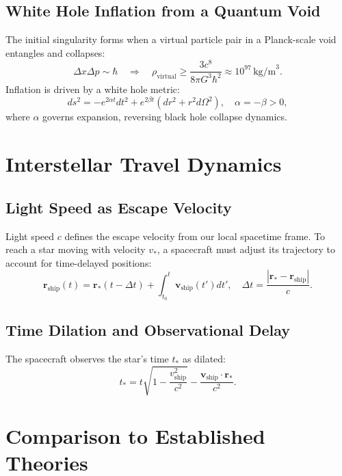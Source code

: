 \documentclass[12pt, a4paper]{article}
\begin{document}
\subsection{White Hole Inflation from a Quantum Void}
The initial singularity forms when a virtual particle pair in a Planck-scale void entangles and collapses:
\begin{equation}
\Delta x \Delta p \sim \hbar \quad \Rightarrow \quad \rho_{\text{virtual}} \geq \frac{3c^8}{8\pi G^3 \hbar^2} \approx 10^{97} \, \text{kg/m}^3. \label{eq:singularity}
\end{equation}
Inflation is driven by a white hole metric:
\begin{equation}
ds^2 = -e^{2\alpha t} dt^2 + e^{2\beta t} \left( dr^2 + r^2 d\Omega^2 \right), \quad \alpha = -\beta > 0, \label{eq:metric}
\end{equation}
where \( \alpha \) governs expansion, reversing black hole collapse dynamics.

\section{Interstellar Travel Dynamics}
\subsection{Light Speed as Escape Velocity}
Light speed \( c \) defines the escape velocity from our local spacetime frame. To reach a star moving with velocity \( v_* \), a spacecraft must adjust its trajectory to account for time-delayed positions:
\begin{equation}
\bm{r}_{\text{ship}}(t) = \bm{r}_*(t - \Delta t) + \int_{t_0}^{t} \bm{v}_{\text{ship}}(t') dt', \quad \Delta t = \frac{|\bm{r}_* - \bm{r}_{\text{ship}}|}{c}. \label{eq:travel}
\end{equation}

\subsection{Time Dilation and Observational Delay}
The spacecraft observes the star’s time \( t_* \) as dilated:
\begin{equation}
t_* = t \sqrt{1 - \frac{v_{\text{ship}}^2}{c^2}} - \frac{\bm{v}_{\text{ship}} \cdot \bm{r}_*}{c^2}. \label{eq:dilation}
\end{equation}

\section{Comparison to Established Theories}
\end{document}
